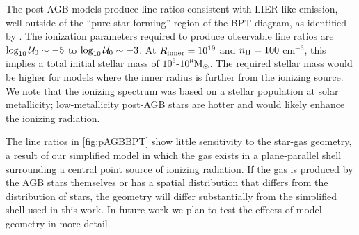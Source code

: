 The post-AGB models produce line ratios consistent with LIER-like emission, well outside of the ``pure star forming'' region of the BPT diagram, as identified by \citet{Kauffmann03a}. The ionization parameters required to produce observable line ratios are $\log_{10} \mathcal{U}_0 \sim -5$ to  $\log_{10} \mathcal{U}_0 \sim -3$. At $R_{\mathrm{inner}}=10^{19}$ and $n_{\mathrm{H}}=100$ cm$^{-3}$, this implies a total initial stellar mass of $10^6$-$10^8\mathrm{M_{\odot}}$. The required stellar mass would be higher for models where the inner radius is further from the ionizing source. We note that the ionizing spectrum was based on a stellar population at solar metallicity; low-metallicity post-AGB stars are hotter and would likely enhance the ionizing radiation.

The line ratios in \ref{fig:pAGBBPT} show little sensitivity to the star-gas geometry, a result of our simplified model in which the gas exists in a plane-parallel shell surrounding a central point source of ionizing radiation. If the gas is produced by the AGB stars themselves or has a spatial distribution that differs from the distribution of stars, the geometry will differ substantially from the simplified shell used in this work. In future work we plan to test the effects of model geometry in more detail. 


